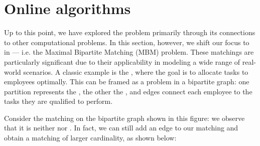\documentclass[a4paper, 12pt]{report}
\begin{document}
    \chapter{Online algorithms}

    Up to this point, we have explored the  problem primarily through its connections to other computational problems. In this section, however, we shift our focus to  in  --- i.e. the Maximal Bipartite Matching (MBM) problem. These matchings are particularly significant due to their applicability in modeling a wide range of real-world scenarios. A classic example is the , where the goal is to allocate tasks to employees optimally. This can be framed as a  problem in a bipartite graph: one partition represents the , the other the , and edges connect each employee to the tasks they are qualified to perform.

    \begin{figure}[H]
        \centering
    \end{figure}

    Consider the matching on the bipartite graph shown in this figure: we observe that it is neither  nor . In fact, we can still add an edge to our matching and obtain a matching of larger cardinality, as shown below:
\end{document}
